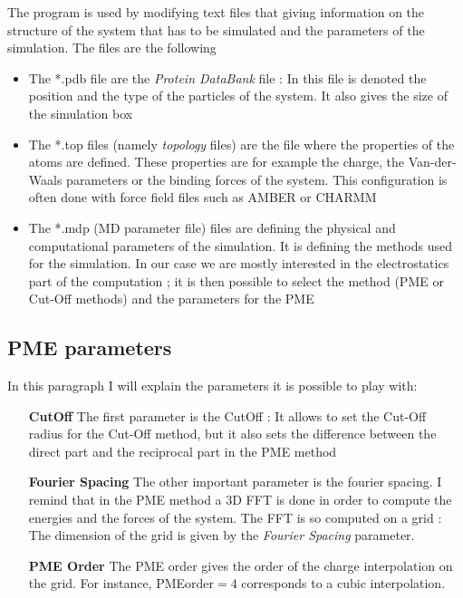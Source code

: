 \documentclass[11pt,twoside,a4paper]{report}
\begin{document}
	 The program is used  by modifying text files that giving information on the structure of the system that has to be simulated and the parameters of the simulation. The files are the following 
	 
	\begin{itemize}
	
	\item The *.pdb file are the \textit{Protein DataBank} file : In this file is denoted the position and the type of the particles of the system. It also gives the size of the simulation box

	\item The *.top files (namely \textit{topology} files) are the file where the properties of the atoms are defined. These properties are for example the charge, the Van-der-Waals parameters or the binding forces of the system. This configuration is often done with force field files such as AMBER or CHARMM
		 
	\item The *.mdp (MD parameter file) files are defining the physical and computational parameters of the simulation. It is defining the methods used for the simulation. In our case we are mostly interested in the electrostatics part of the computation ; it is then possible to select the method (PME or Cut-Off methods) and the parameters for the PME
	
	\end{itemize}
		
	\subsection{PME parameters}
	
	In this paragraph I will explain the parameters it is possible to play with:
	
	\begin{enumerate}
	

	\item[\textbf{CutOff}] The first parameter is the CutOff : It allows to set the Cut-Off radius for the Cut-Off method, but it also sets the difference between the direct part and the reciprocal part in the PME method
	
	\item[\textbf{Fourier Spacing}] The other important parameter is the fourier spacing. I remind that in the PME method a 3D FFT is done in order to compute the energies and the forces of the system. The FFT is so computed on a grid : The dimension of the grid is given by the \textit{Fourier Spacing} parameter.
	
	\item[\textbf{PME Order}] The PME order gives the order of the charge interpolation on the grid. For instance, PMEorder$= 4$ corresponds to a cubic interpolation. 		
	
	\end{enumerate}
	
\end{document}
